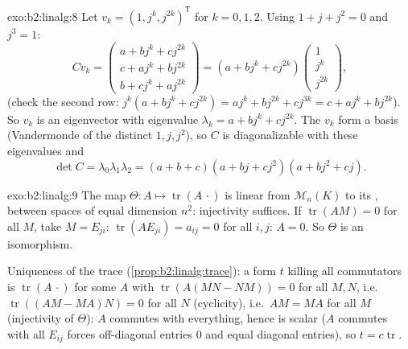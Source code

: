 \begin{solution}{exo:b2:linalg:8}
Let $v_k = (1, j^k, j^{2k})^{\mathsf T}$ for $k = 0, 1, 2$. Using $1
+ j + j^2 = 0$ and $j^3 = 1$:
\[
C v_k =
\begin{pmatrix}
a + b j^k + c j^{2k}\\
c + a j^k + b j^{2k}\\
b + c j^k + a j^{2k}
\end{pmatrix}
= (a + b j^k + c j^{2k})
\begin{pmatrix} 1\\ j^k\\ j^{2k}\end{pmatrix},
\]
(check the second row: $j^k(a + bj^k + cj^{2k}) = aj^k + bj^{2k} +
cj^{3k} = c + aj^k + bj^{2k}$). So $v_k$ is an eigenvector with
eigenvalue $\lambda_k = a + bj^k + cj^{2k}$. The $v_k$ form a basis
(Vandermonde of the distinct $1, j, j^2$), so $C$ is diagonalizable
with these eigenvalues and
\[
\det C = \lambda_0\lambda_1\lambda_2
= (a+b+c)(a + bj + cj^2)(a + bj^2 + cj).
\]
\end{solution}

\begin{solution}{exo:b2:linalg:9}
The map $\Theta \colon A \mapsto \operatorname{tr}(A\,\cdot)$ is
linear from $\mathcal{M}_n(K)$ to its , between spaces of equal
dimension $n^2$: injectivity suffices. If $\operatorname{tr}(AM) =
0$ for all $M$, take $M = E_{ji}$: $\operatorname{tr}(A E_{ji}) =
a_{ij} = 0$ for all $i, j$: $A = 0$. So $\Theta$ is an isomorphism.

Uniqueness of the trace (\cref{prop:b2:linalg:trace}): a form $t$
killing all commutators is $\operatorname{tr}(A\,\cdot)$ for some
$A$ with $\operatorname{tr}(A(MN - NM)) = 0$ for all $M, N$, i.e.\
$\operatorname{tr}((AM - MA)N) = 0$ for all $N$ (cyclicity), i.e.\
$AM = MA$ for all $M$ (injectivity of $\Theta$): $A$ commutes with
everything, hence is scalar ($A$ commutes with all $E_{ij}$ forces
off-diagonal entries $0$ and equal diagonal entries), so $t = c
\operatorname{tr}$.
\end{solution}

